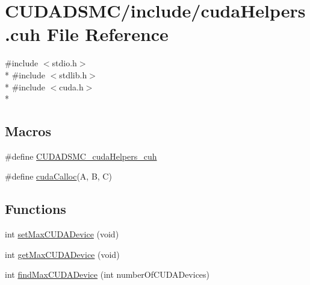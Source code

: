 \hypertarget{cuda_helpers_8cuh}{\section{C\+U\+D\+A\+D\+S\+M\+C/include/cuda\+Helpers.cuh File Reference}
\label{cuda_helpers_8cuh}
}
{\ttfamily \#include $<$stdio.\+h$>$}\\*
{\ttfamily \#include $<$stdlib.\+h$>$}\\*
{\ttfamily \#include $<$cuda.\+h$>$}\\*
\subsection*{Macros}
\begin{DoxyCompactItemize}
\item 
\#define \hyperlink{cuda_helpers_8cuh_a40e204da84e275f42e4908d9001b2020}{C\+U\+D\+A\+D\+S\+M\+C\+\_\+cuda\+Helpers\+\_\+cuh}
\item 
\#define \hyperlink{cuda_helpers_8cuh_a4be8a1ef53f2b51cf88a1cb8d7d4fa56}{cuda\+Calloc}(A, B, C)
\end{DoxyCompactItemize}
\subsection*{Functions}
\begin{DoxyCompactItemize}
\item 
int \hyperlink{cuda_helpers_8cuh_a3932624435386d42fbbae3baa5427ea7}{set\+Max\+C\+U\+D\+A\+Device} (void)
\item 
int \hyperlink{cuda_helpers_8cuh_aa9d1113c5dfae69bf665cde1540b10b0}{get\+Max\+C\+U\+D\+A\+Device} (void)
\item 
int \hyperlink{cuda_helpers_8cuh_a5a240b2ccb6a4fdb776a9bf0a338a6ea}{find\+Max\+C\+U\+D\+A\+Device} (int number\+Of\+C\+U\+D\+A\+Devices)
\end{DoxyCompactItemize}


